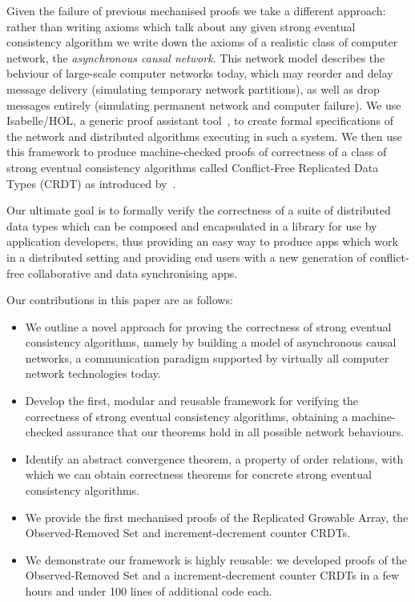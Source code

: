 \documentclass[acmlarge,review,anonymous]{acmart}\settopmatter{printfolios=true}
\begin{document}
Given the failure of previous mechanised proofs we take a different approach: rather than writing axioms which talk about any given strong eventual consistency algorithm we write down the axioms of a realistic class of computer network, the \emph{asynchronous causal network}.
This network model describes the behviour of large-scale computer networks today, which may reorder and delay message delivery (simulating temporary network partitions), as well as drop messages entirely (simulating permanent network and computer failure).
We use Isabelle/HOL, a generic proof assistant tool~\cite{DBLP:conf/tphol/WenzelPN08}, to create formal specifications of the network and distributed algorithms executing in such a system. 
We then use this framework to produce machine-checked proofs of correctness of a class of strong eventual consistency algorithms called Conflict-Free Replicated Data Types (CRDT) as introduced by~\citet{Shapiro:2011wy,Shapiro:2011un}. 

Our ultimate goal is to formally verify the correctness of a suite of distributed data types which can be composed and encapsulated in a library for use by application developers, thus providing an easy way to produce apps which work in a distributed setting and providing end users with a new generation of conflict-free collaborative and data synchronising apps.

Our contributions in this paper are as follows:
\begin{itemize}
\item We outline a novel approach for proving the correctness of strong eventual consistency algorithms, namely by building a model of asynchronous causal networks, a communication paradigm supported by virtually all computer network technologies today.
%
\item Develop the first, modular and reusable framework for verifying the correctness of strong eventual consistency algorithms, obtaining a machine-checked assurance that our theorems hold in all possible network behaviours.
%
\item Identify an abstract convergence theorem, a property of order relations, with which we can obtain correctness theorems for concrete strong eventual consistency algorithms.
%
\item We provide the first mechanised proofs of the Replicated Growable Array, the Observed-Removed Set and increment-decrement counter CRDTs. 
%
\item We demonstrate our framework is highly reusable: we developed proofs of the Observed-Removed Set and a increment-decrement counter CRDTs in a few hours and under 100 lines of additional code each.
\end{itemize}
\end{document}
